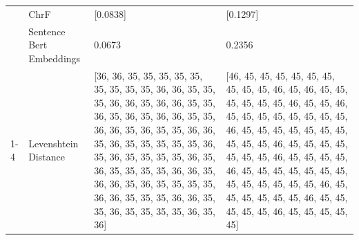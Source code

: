 \begin{tabular}{llll}
 & ChrF & [0.0838] & [0.1297] \\
 & Sentence Bert Embeddings & 0.0673 & 0.2356 \\
\cline{1-4}
\multirow[t]{4}{*}{Kiringiri gia aka ni rwenji rukirega} & Levenshtein Distance & [36, 36, 35, 35, 35, 35, 35, 35, 35, 35, 35, 36, 36, 35, 35, 35, 36, 36, 35, 36, 36, 35, 35, 36, 35, 36, 35, 36, 36, 35, 35, 36, 36, 35, 36, 35, 35, 36, 36, 35, 36, 35, 35, 35, 35, 35, 36, 35, 36, 35, 35, 35, 35, 36, 35, 36, 35, 35, 35, 35, 36, 36, 35, 36, 36, 35, 36, 35, 35, 35, 35, 36, 36, 35, 35, 35, 36, 36, 35, 35, 36, 35, 35, 35, 35, 36, 35, 36] & [46, 45, 45, 45, 45, 45, 45, 45, 45, 45, 46, 45, 46, 45, 45, 45, 45, 45, 45, 46, 45, 45, 46, 45, 45, 45, 45, 45, 45, 45, 45, 46, 45, 45, 45, 45, 45, 45, 45, 45, 45, 45, 46, 45, 45, 45, 45, 45, 45, 45, 46, 45, 45, 45, 45, 46, 45, 45, 45, 45, 45, 45, 45, 45, 45, 45, 45, 45, 45, 46, 45, 45, 45, 45, 45, 45, 46, 45, 45, 45, 45, 45, 46, 45, 45, 45, 45, 45] \\

\end{tabular}
